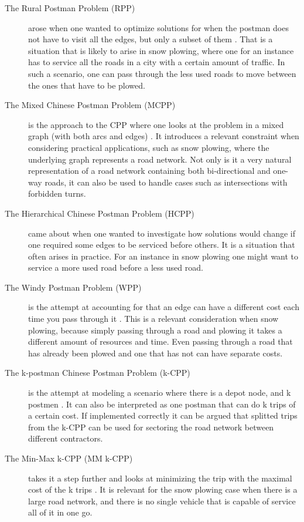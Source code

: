 \begin{description}

\item [The Rural Postman Problem (RPP)] arose when one wanted to optimize solutions for when the postman does not have to visit all the edges, but only a subset of them \citep{pearn1995RPP}. That is a situation that is likely to arise in snow plowing, where one for an instance has to service all the roads in a city with a certain amount of traffic. In such a scenario, one can pass through the less used roads to move between the ones that have to be plowed.



\item [The Mixed Chinese Postman Problem (MCPP)] is the approach to the CPP where one looks at the problem in a mixed graph (with both arcs and edges) \citep{pearn1995mixedCPP}. It introduces a relevant constraint when considering practical applications, such as snow plowing, where the underlying graph represents a road network. Not only is it a very natural representation of a road network containing both bi-directional and one-way roads, it can also be used to handle cases such as intersections with forbidden turns.

\item [The Hierarchical Chinese Postman Problem (HCPP)] \citep{ghiani2000HCPP} came about when one wanted to investigate how solutions would change if one required some edges to be serviced before others. It is a situation that often arises in practice. For an instance in snow plowing one might want to service a more used road before a less used road.

\item [The Windy Postman Problem (WPP)] is the attempt at accounting for that an edge can have a different cost each time you pass through it \citep{dussault2013WPP}. This is a relevant consideration when snow plowing, because simply passing through a road and plowing it takes a different amount of resources and time. Even passing through a road that has already been plowed and one that has not can have separate costs.

\item [The k-postman Chinese Postman Problem (k-CPP)] is the attempt at modeling a scenario where there is a depot node, and k postmen \citep{edmonds1973kCPP}. It can also be interpreted as one postman that can do k trips of a certain cost. If implemented correctly it can be argued that splitted trips from the k-CPP can be used for sectoring the road network between different contractors.

\item[The Min-Max k-CPP (MM k-CPP)] takes it a step further and looks at minimizing the trip with the maximal cost of the k trips \citep{frederickson1976MMkCPP}. It is relevant for the snow plowing case when there is a large road network, and there is no single vehicle that is capable of service all of it in one go. 

\end{description}

